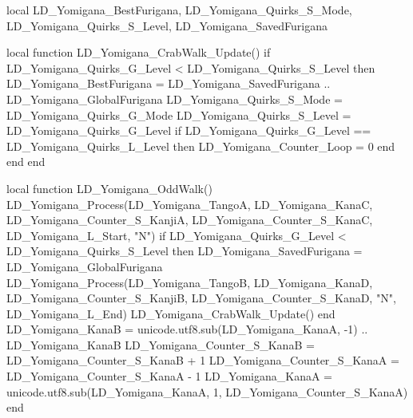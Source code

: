 {		
			local LD_Yomigana_BestFurigana, LD_Yomigana_Quirks_S_Mode, LD_Yomigana_Quirks_S_Level, LD_Yomigana_SavedFurigana

			local function LD_Yomigana_CrabWalk_Update()
				if LD_Yomigana_Quirks_G_Level < LD_Yomigana_Quirks_S_Level then
					LD_Yomigana_BestFurigana = LD_Yomigana_SavedFurigana .. LD_Yomigana_GlobalFurigana
					LD_Yomigana_Quirks_S_Mode = LD_Yomigana_Quirks_G_Mode  %
					LD_Yomigana_Quirks_S_Level = LD_Yomigana_Quirks_G_Level  %
					if LD_Yomigana_Quirks_G_Level == LD_Yomigana_Quirks_L_Level then
						LD_Yomigana_Counter_Loop = 0 %
					end
				end
			end
			
			
			local function LD_Yomigana_OddWalk()
				LD_Yomigana_Process(LD_Yomigana_TangoA, LD_Yomigana_KanaC, LD_Yomigana_Counter_S_KanjiA, LD_Yomigana_Counter_S_KanaC, 	LD_Yomigana_L_Start, "N") 
				if LD_Yomigana_Quirks_G_Level < LD_Yomigana_Quirks_S_Level then %
					LD_Yomigana_SavedFurigana = LD_Yomigana_GlobalFurigana
					LD_Yomigana_Process(LD_Yomigana_TangoB, LD_Yomigana_KanaD, LD_Yomigana_Counter_S_KanjiB, LD_Yomigana_Counter_S_KanaD, "N", LD_Yomigana_L_End) 
					LD_Yomigana_CrabWalk_Update()
				end
				LD_Yomigana_KanaB = unicode.utf8.sub(LD_Yomigana_KanaA, -1) ..  LD_Yomigana_KanaB
				LD_Yomigana_Counter_S_KanaB = LD_Yomigana_Counter_S_KanaB + 1
				LD_Yomigana_Counter_S_KanaA = LD_Yomigana_Counter_S_KanaA - 1
				LD_Yomigana_KanaA = unicode.utf8.sub(LD_Yomigana_KanaA, 1, LD_Yomigana_Counter_S_KanaA)
			end

}
